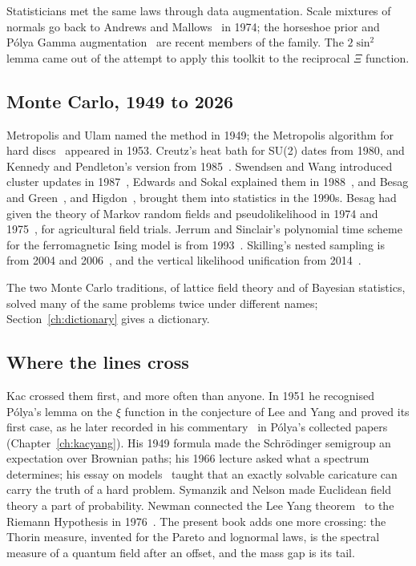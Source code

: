 Statisticians met the same laws through data augmentation. Scale mixtures of normals go back to Andrews and Mallows~\cite{AM74} in 1974; the horseshoe prior and P\'olya Gamma augmentation~\cite{PSW13} are recent members of the family. The $2\sin^2$ lemma came out of the attempt to apply this toolkit to the reciprocal $\Xi$ function.

\subsection{Monte Carlo, 1949 to 2026}

Metropolis and Ulam named the method in 1949; the Metropolis algorithm for hard discs~\cite{MR53} appeared in 1953. Creutz's heat bath for SU(2) dates from 1980, and Kennedy and Pendleton's version from 1985~\cite{KP85}. Swendsen and Wang introduced cluster updates in 1987~\cite{SW87}, Edwards and Sokal explained them in 1988~\cite{ES88}, and Besag and Green~\cite{BG93}, and Higdon~\cite{Hi98}, brought them into statistics in the 1990s. Besag had given the theory of Markov random fields and pseudolikelihood in 1974 and 1975~\cite{Be74,Be75}, for agricultural field trials. Jerrum and Sinclair's polynomial time scheme for the ferromagnetic Ising model is from 1993~\cite{JS93}. Skilling's nested sampling is from 2004 and 2006~\cite{Sk06}, and the vertical likelihood unification from 2014~\cite{PSvl}.

The two Monte Carlo traditions, of lattice field theory and of Bayesian statistics, solved many of the same problems twice under different names; Section~\ref{ch:dictionary} gives a dictionary.

\subsection{Where the lines cross}

Kac crossed them first, and more often than anyone. In 1951 he recognised P\'olya's lemma on the $\xi$ function in the conjecture of Lee and Yang and proved its first case, as he later recorded in his commentary~\cite{Ka74} in P\'olya's collected papers (Chapter~\ref{ch:kacyang}). His 1949 formula made the Schr\"odinger semigroup an expectation over Brownian paths; his 1966 lecture asked what a spectrum determines; his essay on models~\cite{Ka69} taught that an exactly solvable caricature can carry the truth of a hard problem. Symanzik and Nelson made Euclidean field theory a part of probability. Newman connected the Lee Yang theorem~\cite{LY52} to the Riemann Hypothesis in 1976~\cite{Ne76}. The present book adds one more crossing: the Thorin measure, invented for the Pareto and lognormal laws, is the spectral measure of a quantum field after an offset, and the mass gap is its tail.

